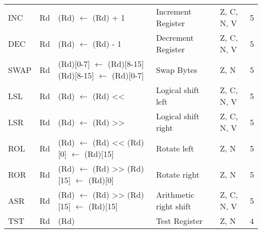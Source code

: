 \begin{footnotesize}
\begin{tabular}{|p{14.5mm}|p{14mm}|p{47mm}|p{46.5mm}|p{14mm}|p{10mm}|}
    INC      & Rd        & (Rd) $\leftarrow$ (Rd) + 1                                                        & Increment Register                        & Z, C, N, V     & 5      \\
    DEC      & Rd        & (Rd) $\leftarrow$ (Rd) - 1                                                        & Decrement Register                        & Z, C, N, V     & 5      \\
    SWAP     & Rd        & (Rd){[}0-7{]} $\leftarrow$ (Rd){[}8-15{]} \newline (Rd){[}8-15{]} $\leftarrow$ (Rd){[}0-7{]}        & Swap Bytes                         & Z, N           & 5      \\
    LSL      & Rd        & (Rd) $\leftarrow$ (Rd) \textless{}\textless\:1                                     & Logical shift left                        & Z, C, N, V     & 5      \\
    LSR      & Rd        & (Rd) $\leftarrow$ (Rd) \textgreater{}\textgreater\:1                               & Logical shift right                       & Z, C, N, V     & 5      \\
    ROL      & Rd        & (Rd) $\leftarrow$ (Rd) \textless{}\textless\:1 \newline (Rd){[}0{]} $\leftarrow$ (Rd){[}15{]}        & Rotate left                        & Z, N           & 5      \\
    ROR      & Rd        & (Rd) $\leftarrow$ (Rd) \textgreater{}\textgreater\:1 \newline (Rd){[}15{]} $\leftarrow$ (Rd){[}0{]}  & Rotate right                       & Z, N           & 5      \\
    ASR      & Rd        & (Rd) $\leftarrow$ (Rd) \textgreater{}\textgreater\:1 \newline (Rd){[}15{]} $\leftarrow$ (Rd){[}15{]} & Arithmetic right shift             & Z, C, N, V     & 5      \\
    TST      & Rd        & (Rd)                                                                   & Test Register                             & Z, N           & 4      \\
    \hline
\end{tabular}\\

\end{footnotesize}
